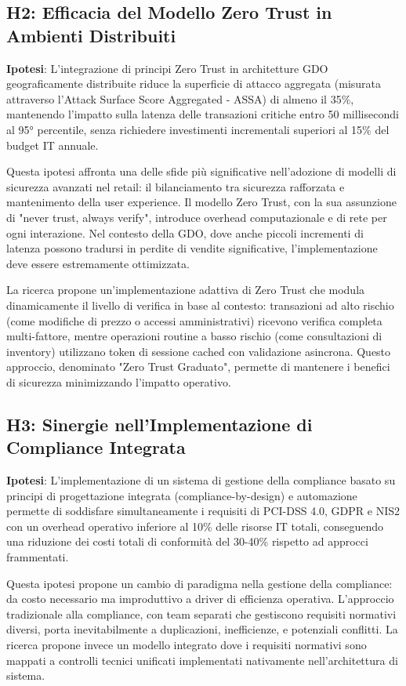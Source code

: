 \subsection{H2: Efficacia del Modello Zero Trust in Ambienti Distribuiti}

\textbf{Ipotesi}: L'integrazione di principi Zero Trust in architetture GDO geograficamente distribuite riduce la superficie di attacco aggregata (misurata attraverso l'Attack Surface Score Aggregated - ASSA) di almeno il 35\%, mantenendo l'impatto sulla latenza delle transazioni critiche entro 50 millisecondi al 95° percentile, senza richiedere investimenti incrementali superiori al 15\% del budget IT annuale.

Questa ipotesi affronta una delle sfide più significative nell'adozione di modelli di sicurezza avanzati nel retail: il bilanciamento tra sicurezza rafforzata e mantenimento della user experience. Il modello Zero Trust, con la sua assunzione di "never trust, always verify", introduce overhead computazionale e di rete per ogni interazione. Nel contesto della GDO, dove anche piccoli incrementi di latenza possono tradursi in perdite di vendite significative, l'implementazione deve essere estremamente ottimizzata.

La ricerca propone un'implementazione adattiva di Zero Trust che modula dinamicamente il livello di verifica in base al contesto: transazioni ad alto rischio (come modifiche di prezzo o accessi amministrativi) ricevono verifica completa multi-fattore, mentre operazioni routine a basso rischio (come consultazioni di inventory) utilizzano token di sessione cached con validazione asincrona. Questo approccio, denominato "Zero Trust Graduato", permette di mantenere i benefici di sicurezza minimizzando l'impatto operativo.

\subsection{H3: Sinergie nell'Implementazione di Compliance Integrata}

\textbf{Ipotesi}: L'implementazione di un sistema di gestione della compliance basato su principi di progettazione integrata (compliance-by-design) e automazione permette di soddisfare simultaneamente i requisiti di PCI-DSS 4.0, GDPR e NIS2 con un overhead operativo inferiore al 10\% delle risorse IT totali, conseguendo una riduzione dei costi totali di conformità del 30-40\% rispetto ad approcci frammentati.

Questa ipotesi propone un cambio di paradigma nella gestione della compliance: da costo necessario ma improduttivo a driver di efficienza operativa. L'approccio tradizionale alla compliance, con team separati che gestiscono requisiti normativi diversi, porta inevitabilmente a duplicazioni, inefficienze, e potenziali conflitti. La ricerca propone invece un modello integrato dove i requisiti normativi sono mappati a controlli tecnici unificati implementati nativamente nell'architettura di sistema.

